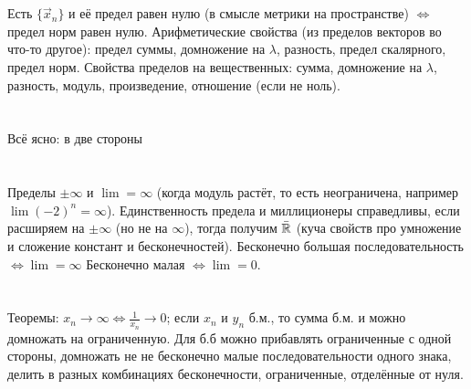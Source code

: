 \section{} %
Есть $\{\vec x_n\}$ и её предел равен нулю (в смысле метрики на пространстве) $\iff$ предел норм равен нулю.
Арифметические свойства (из пределов векторов во что-то другое): предел суммы, домножение на $\lambda$, разность, предел скалярного, предел норм.
Свойства пределов на вещественных: сумма, домножение на $\lambda$, разность, модуль, произведение, отношение (если не ноль).

\section{} %
Всё ясно: в две стороны

\section{} %
Пределы $\pm\infty$ и $\lim = \infty$ (когда модуль растёт, то есть неограничена, например $\lim(-2)^n=\infty$).
Единственность предела и миллиционеры справедливы, если расширяем на $\pm\infty$ (но не на $\infty$), тогда
получим $\bar {\mathbb{R}}$ (куча свойств про умножение и сложение констант и бесконечностей).
Бесконечно большая последовательность $\iff \lim = \infty$ 
Бесконечно малая $\iff \lim = 0$.

\section{} %
Теоремы: $x_n \to \infty \iff \frac{1}{x_n} \to 0$; если $x_n$ и $y_n$ б.м., то сумма б.м. и можно
домножать на ограниченную. Для б.б можно прибавлять ограниченные с одной стороны, домножать
не не бесконечно малые последовательности одного знака, делить в разных комбинациях бесконечности,
ограниченные, отделённые от нуля.
